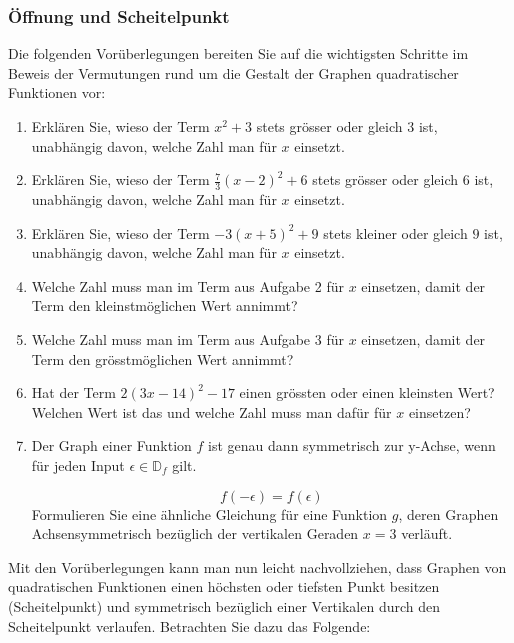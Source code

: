 \subsubsection{Öffnung und Scheitelpunkt}
Die folgenden Vorüberlegungen bereiten Sie auf die wichtigsten Schritte im Beweis der Vermutungen rund um die Gestalt der Graphen quadratischer Funktionen vor:
\begin{enumerate}
    \item Erklären Sie, wieso der Term $x^2+3$ stets grösser oder gleich $3$ ist, unabhängig davon, welche Zahl man für $x$ einsetzt.

    \item Erklären Sie, wieso der Term $\frac{7}{3} (x-2)^2+6$ stets grösser oder gleich $6$ ist, unabhängig davon, welche Zahl man für $x$ einsetzt.

    \item Erklären Sie, wieso der Term $-3(x+5)^2+9$ stets kleiner oder gleich $9$ ist, unabhängig davon, welche Zahl man für $x$ einsetzt.

    \item 	Welche Zahl muss man im Term aus Aufgabe 2 für $x$ einsetzen, damit der Term den kleinstmöglichen Wert annimmt?
          \newpage
    \item Welche Zahl muss man im Term aus Aufgabe $3$ für $x$ einsetzen, damit der Term den grösstmöglichen Wert annimmt?

    \item Hat der Term $2(3x-14)^2-17$ einen grössten oder einen kleinsten Wert? Welchen Wert ist das und welche Zahl muss man dafür für $x$ einsetzen?

    \item Der Graph einer Funktion $f$ ist genau dann symmetrisch zur y-Achse, wenn für jeden Input $\epsilon \in \mathbb{D}_f$ gilt.

          \[
              f(-\epsilon)=f(\epsilon)
          \]
          Formulieren Sie eine ähnliche Gleichung für eine Funktion $g$, deren Graphen Achsensymmetrisch bezüglich der vertikalen Geraden $x=3$ verläuft.

\end{enumerate}
\newpage

Mit den Vorüberlegungen kann man nun leicht nachvollziehen, dass Graphen von quadratischen Funktionen einen höchsten oder tiefsten Punkt besitzen (Scheitelpunkt) und symmetrisch bezüglich einer Vertikalen durch den Scheitelpunkt verlaufen. Betrachten Sie dazu das Folgende:


